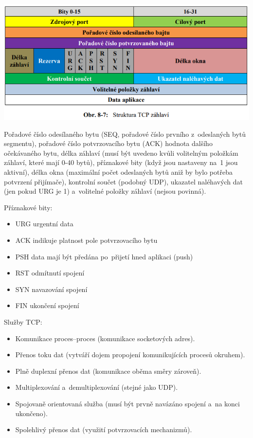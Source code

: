 \begin{center}
\includegraphics[scale = 0.5]{images/-051.png}
\end{center}

Pořadové číslo odesílaného bytu (SEQ, pořadové číslo prvního z~odeslaných bytů segmentu), pořadové číslo potvrzovacího bytu (ACK) hodnota dalšího očekávaného bytu, délka záhlaví (musí být uvedeno kvůli volitelným položkám záhlaví, které mají 0-40 bytů), příznakové bity (když jsou nastaveny na~1 jsou aktivní), délka okna (maximální počet odeslaných bytů aniž by bylo potřeba potvrzení přijímače), kontrolní součet (podobný UDP), ukazatel naléhavých dat (jen pokud URG je 1) a~volitelné položky záhlaví (nejsou povinná).

Příznakové bity:
\begin{itemize}[noitemsep]
    \item URG urgentní data
    \item ACK indikuje platnost pole potvrzovacího bytu
    \item PSH data mají být předána po~přijetí hned aplikaci (push)
    \item RST odmítnutí spojení
    \item SYN navazování spojení
    \item FIN ukončení spojení
\end{itemize}

Služby TCP:
\begin{itemize}[noitemsep]
    \item Komunikace proces--proces (komunikace socketových adres).
    \item Přenos toku dat (vytváří dojem propojení komunikujících procesů okruhem).
    \item Plně duplexní přenos dat (komunikace oběma směry zároveň).
    \item Multiplexování a~demultiplexování (stejné jako UDP).
    \item Spojovaně orientovaná služba (musí být prvně navázáno spojení a~na konci ukončeno).
    \item Spolehlivý přenos dat (využití potvrzovacích mechanizmů).
\end{itemize}

